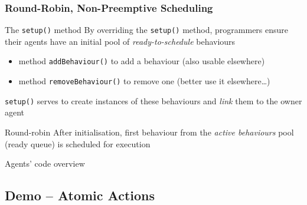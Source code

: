 \documentclass{beamer}\mode<presentation>{\usetheme{AMSCesenaPurpleAndGold}}
\begin{document}
\begin{frame}[c,allowframebreaks]\frametitle{Round-Robin, Non-Preemptive Scheduling}
    \begin{block}{The \texttt{setup()} method}
        By overriding the \texttt{setup()} method, \jade{} programmers ensure their agents have an initial pool of \emph{ready-to-schedule} behaviours
        \begin{itemize}
            \item method \texttt{addBehaviour()} to add a behaviour (also usable elsewhere)
            \item method \texttt{removeBehaviour()} to remove one (better use it elsewhere\ldots)
        \end{itemize}
        \texttt{setup()} serves to create instances of these behaviours and \emph{link} them to the owner agent
    \end{block}
    \begin{block}{Round-robin}
        After initialisation, first behaviour from the \emph{active behaviours} pool (\alert{ready queue}) is scheduled for execution
    \end{block}
\end{frame}

\begin{frame}{Agents' code overview}
    
\end{frame}

\startDemo

\subsection{Demo \currentDemo{} -- Atomic Actions}
\end{document}

